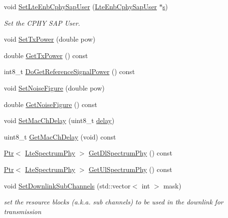 \begin{DoxyCompactItemize}
void \hyperlink{classns3_1_1LteEnbPhy_a1bbe59c611d8d545175ab0a572954286}{Set\+Lte\+Enb\+Cphy\+Sap\+User} (\hyperlink{classns3_1_1LteEnbCphySapUser}{Lte\+Enb\+Cphy\+Sap\+User} $\ast$\hyperlink{generate__test__data__lte__sinr_8m_ad83eeb3a142285d1243a08c6b7026df8}{s})
\begin{DoxyCompactList}\small\item\em Set the C\+P\+HY S\+AP User. \end{DoxyCompactList}\item 
void \hyperlink{classns3_1_1LteEnbPhy_a3dff39fa0c6cf4b44dece689ad79ec2c}{Set\+Tx\+Power} (double pow)
\item 
double \hyperlink{classns3_1_1LteEnbPhy_a8ec718d2f1f6f6da5c36ca8325513d2d}{Get\+Tx\+Power} () const 
\item 
int8\+\_\+t \hyperlink{classns3_1_1LteEnbPhy_a1bad42f50ab4ad0672427cc71263fe66}{Do\+Get\+Reference\+Signal\+Power} () const 
\item 
void \hyperlink{classns3_1_1LteEnbPhy_a95f51fd03ed9b5a4342c2ce9a0bfd048}{Set\+Noise\+Figure} (double pow)
\item 
double \hyperlink{classns3_1_1LteEnbPhy_a937cd54335f941fb584d457a899e6c82}{Get\+Noise\+Figure} () const 
\item 
void \hyperlink{classns3_1_1LteEnbPhy_a969782c4f1d30e0285e70bc73bb79290}{Set\+Mac\+Ch\+Delay} (uint8\+\_\+t \hyperlink{mmwave_2model_2fading-traces_2fading__trace__generator_8m_a7964e6aa8f61a9d28973c8267a606ad8}{delay})
\item 
uint8\+\_\+t \hyperlink{classns3_1_1LteEnbPhy_abffa6cd054214eff16794496a4f17b71}{Get\+Mac\+Ch\+Delay} (void) const 
\item 
\hyperlink{classns3_1_1Ptr}{Ptr}$<$ \hyperlink{classns3_1_1LteSpectrumPhy}{Lte\+Spectrum\+Phy} $>$ \hyperlink{classns3_1_1LteEnbPhy_a48903df79ea99fc0ab40d1f07acf6c57}{Get\+Dl\+Spectrum\+Phy} () const 
\item 
\hyperlink{classns3_1_1Ptr}{Ptr}$<$ \hyperlink{classns3_1_1LteSpectrumPhy}{Lte\+Spectrum\+Phy} $>$ \hyperlink{classns3_1_1LteEnbPhy_acd2a3a9c742215bc432b0b95fc479f6d}{Get\+Ul\+Spectrum\+Phy} () const 
\item 
void \hyperlink{classns3_1_1LteEnbPhy_ae08f44082020ac0b68a04a2a79da0a27}{Set\+Downlink\+Sub\+Channels} (std\+::vector$<$ int $>$ mask)
\begin{DoxyCompactList}\small\item\em set the resource blocks (a.\+k.\+a. sub channels) to be used in the downlink for transmission \end{DoxyCompactList}\item 

\end{DoxyCompactItemize}
